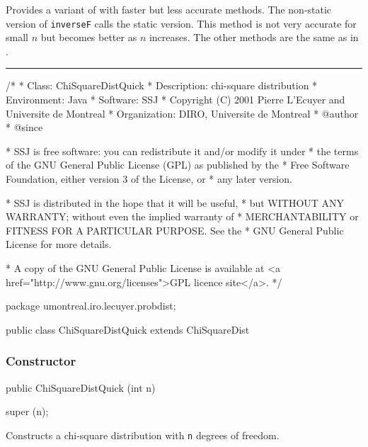 
Provides a variant of  with
faster but less accurate methods.
The non-static version of 
\texttt{inverseF} calls the static version.
This method is not very accurate for small $n$ but becomes
better as $n$ increases.
The other methods are the same as in .

\bigskip\hrule

\begin{code}
\begin{hide}
/*
 * Class:        ChiSquareDistQuick
 * Description:  chi-square distribution
 * Environment:  Java
 * Software:     SSJ 
 * Copyright (C) 2001  Pierre L'Ecuyer and Universite de Montreal
 * Organization: DIRO, Universite de Montreal
 * @author       
 * @since

 * SSJ is free software: you can redistribute it and/or modify it under
 * the terms of the GNU General Public License (GPL) as published by the
 * Free Software Foundation, either version 3 of the License, or
 * any later version.

 * SSJ is distributed in the hope that it will be useful,
 * but WITHOUT ANY WARRANTY; without even the implied warranty of
 * MERCHANTABILITY or FITNESS FOR A PARTICULAR PURPOSE.  See the
 * GNU General Public License for more details.

 * A copy of the GNU General Public License is available at
   <a href="http://www.gnu.org/licenses">GPL licence site</a>.
 */
\end{hide}
package umontreal.iro.lecuyer.probdist;


public class ChiSquareDistQuick extends ChiSquareDist\begin{hide} {
\end{hide}
\end{code}
\subsubsection* {Constructor}

\begin{code}

   public ChiSquareDistQuick (int n)\begin{hide} {
      super (n);
   }\end{hide}
\end{code}
\begin{tabb}
   Constructs a chi-square distribution with \texttt{n} degrees of freedom.
\end{tabb}

